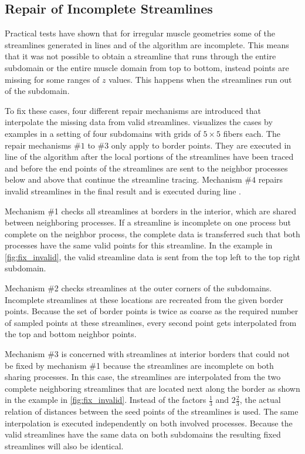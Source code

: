 \subsection{Repair of Incomplete Streamlines}

Practical tests have shown that for irregular muscle geometries some of the streamlines generated in lines  and  of the algorithm are incomplete. This means that it was not possible to obtain a streamline that runs through the entire subdomain or the entire muscle domain from top to bottom, instead points are missing for some ranges of $z$ values. This happens when the streamlines run out of the subdomain.

To fix these cases, four different repair mechanisms are introduced that interpolate the missing data from valid streamlines.  visualizes the cases by examples in a setting of four subdomains with grids of $5 \times 5$ fibers each. The repair mechanisms $\#1$ to $\#3$ only apply to border points. They are executed in line  of the algorithm after the local portions of the streamlines have been traced and before the end points of the streamlines are sent to the neighbor processes below and above that continue the streamline tracing. Mechanism $\#4$ repairs invalid streamlines in the final result and is executed during line .

Mechanism \#1 checks all streamlines at borders in the interior, which are shared between neighboring processes. If a streamline is incomplete on one process but complete on the neighbor process, the complete data is transferred such that both processes have the same valid points for this streamline. In the example in \cref{fig:fix_invalid}, the valid streamline data is sent from the top left to the top right subdomain.

Mechanism \#2 checks streamlines at the outer corners of the subdomains. Incomplete streamlines at these locations are recreated from the given border points. Because the set of border points is twice as coarse as the required number of sampled points at these streamlines, every second point gets interpolated from the top and bottom neighbor points.

Mechanism \#3 is concerned with streamlines at interior borders that could not be fixed by mechanism \#1 because the streamlines are incomplete on both sharing processes. In this case, the streamlines are interpolated from the two complete neighboring streamlines that are located next along the border as shown in the example in \cref{fig:fix_invalid}. Instead of the factors $\frac13$ and $2\frac23$, the actual relation of distances between the seed points of the streamlines is used. The same interpolation is executed independently on both involved processes. Because the valid streamlines have the same data on both subdomains the resulting fixed streamlines will also be identical.

